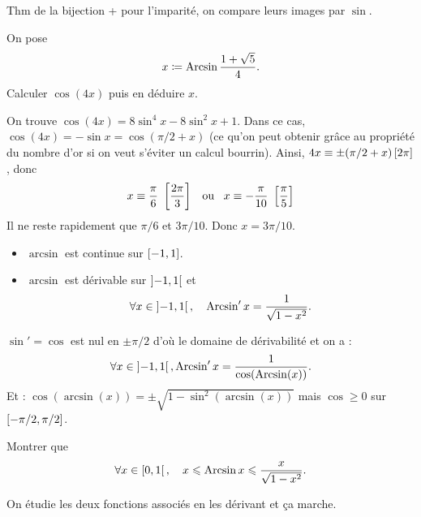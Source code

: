 \documentclass{magnolia}
\begin{document}
\begin{preuve}
Thm de la bijection + pour l'imparité, on compare leurs images par $\sin$.
\end{preuve}

\begin{exoUnique}
\exemple On pose
  \[x\coloneqq\operatorname{Arcsin}\frac{1+\sqrt{5}}{4}.\]
  Calculer $\cos(4x)$ puis en déduire $x$.
  \begin{sol}
  On trouve $\cos(4x)=8\sin^4 x-8\sin^2 x+1$. Dans ce cas, $\cos(4x)=-\sin x=\cos(\pi/2+x)$ (ce qu'on peut obtenir grâce au propriété du nombre d'or si on veut s'éviter un calcul bourrin). Ainsi, $4x \equiv \pm(\pi/2+x)\left[2\pi\right]$, donc
  \[x\equiv \frac{\pi}{6}\  \left[\frac{2\pi}{3}\right] \quad\!\text{ou}\quad\!
    x\equiv -\frac{\pi}{10}\ \left[\frac{\pi}{5}\right]\]
  Il ne reste rapidement que $\pi/6$ et $3\pi/10$. Donc $x=3\pi/10$.
  \end{sol}
\end{exoUnique}

\begin{proposition}[utile=-3]
\begin{itemize}
\item $\arcsin$ est continue sur $\left[-1,1\right]$.
\item $\arcsin$ est dérivable sur $\left]-1,1\right[$ et
  \[\forall x\in\left]-1,1\right[ ,\quad \operatorname{Arcsin}' x=\frac{1}{\sqrt{1-x^2}}.\]
\end{itemize}
\end{proposition}

\begin{preuve}
$\sin'=\cos$ est nul en $\pm \pi/2$ d'où le domaine de dérivabilité et on a :
\[\forall x \in \left]-1,1\right[, \operatorname{Arcsin}' x=\frac{1}{\cos(\operatorname{Arcsin}(x))}.\]
Et : $\cos(\arcsin(x))=\pm \sqrt{1-\sin^2(\arcsin(x))}$ mais $\cos\geq0$ sur $\left[-\pi/2,\pi/2\right]$.
\end{preuve}
\begin{exoUnique}
\exemple Montrer que
  \[\forall x\in\left[0,1\right[ ,\quad x\leqslant\operatorname{Arcsin} x\leqslant\frac{x}{\sqrt{1-x^2}}.\]
  \begin{sol}
  On étudie les deux fonctions associés en les dérivant et ça marche.
  \end{sol}
\end{exoUnique}
\end{document}
